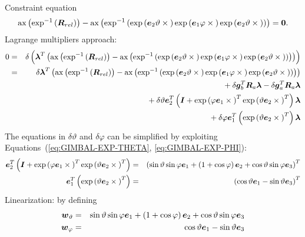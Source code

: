 \documentclass[10pt,dvips,fleqn]{report}
\newcommand{\T}[1]{\boldsymbol{#1}}
\begin{document}
\noindent
Constraint equation
\begin{equation}
	\llk{ax}\plbr{\llk{exp}^{-1}\plbr{\T{R}_{rel}}}
	- \llk{ax}\plbr{\llk{exp}^{-1}\plbr{
		\llk{exp}\plbr{\T{e}_2 \vartheta \times{}}
		\llk{exp}\plbr{\T{e}_1 \varphi \times{}}
		\llk{exp}\plbr{\T{e}_2 \vartheta \times{}}
	}} = \T{0}.
	\label{eq:GIMBAL-CONSTRAINT}
\end{equation}
Lagrange multipliers approach:
\begin{eqnarray*}
	0 & = & \delta\plbr{\T{\lambda}^T\plbr{
	\llk{ax}\plbr{\llk{exp}^{-1}\plbr{\T{R}_{rel}}}
	- \llk{ax}\plbr{\llk{exp}^{-1}\plbr{
		\llk{exp}\plbr{\T{e}_2 \vartheta \times{}}
		\llk{exp}\plbr{\T{e}_1 \varphi \times{}}
		\llk{exp}\plbr{\T{e}_2 \vartheta \times{}}
	}}
	}} \\
	& = & \delta\T{\lambda}^T \plbr{
	\llk{ax}\plbr{\llk{exp}^{-1}\plbr{\T{R}_{rel}}}
	- \llk{ax}\plbr{\llk{exp}^{-1}\plbr{
		\llk{exp}\plbr{\T{e}_2 \vartheta \times{}}
		\llk{exp}\plbr{\T{e}_1 \varphi \times{}}
		\llk{exp}\plbr{\T{e}_2 \vartheta \times{}}
	}}
	} \\
	& & \mbox{} + \delta\T{g}_b^T \T{R}_a \T{\lambda}
	- \delta\T{g}_a^T \T{R}_a \T{\lambda} \\
	& & \mbox{} + \delta\vartheta \T{e}_2^T \plbr{
		\T{I} + \llk{exp}\plbr{\varphi \T{e}_1 \times{}}^T
			\llk{exp}\plbr{\vartheta \T{e}_2 \times{}}^T
	} \T{\lambda} \\
	& & \mbox{} + \delta\varphi \T{e}_1^T \plbr{
		\llk{exp}\plbr{\vartheta \T{e}_2 \times{}}^T
	} \T{\lambda}
\end{eqnarray*}
The equations in $\delta\vartheta $ and $\delta\varphi$ can be simplified
by exploiting Equations~(\ref{eq:GIMBAL-EXP-THETA}, \ref{eq:GIMBAL-EXP-PHI}):
\begin{eqnarray*}
	\T{e}_2^T \plbr{
		\T{I} + \llk{exp}\plbr{\varphi \T{e}_1 \times{}}^T
			\llk{exp}\plbr{\vartheta \T{e}_2 \times{}}^T
	} & = & \plbr{
		\sin\vartheta \sin\varphi \T{e}_1
		+ \plbr{1 + \cos\varphi} \T{e}_2 
		+ \cos\vartheta\sin\varphi \T{e}_3
	}^T \\
	\T{e}_1^T \plbr{
		\llk{exp}\plbr{\vartheta \T{e}_2 \times{}}^T
	} & = & \plbr{
		\cos\vartheta \T{e}_1 - \sin\vartheta \T{e}_3
	}^T 
\end{eqnarray*}
Linearization: by defining
\begin{eqnarray*}
	\T{w}_{\vartheta} & = & 
		\sin\vartheta \sin\varphi \T{e}_1
		+ \plbr{1 + \cos\varphi} \T{e}_2 
		+ \cos\vartheta\sin\varphi \T{e}_3 \\
	\T{w}_{\varphi} & = & 
		\cos\vartheta \T{e}_1 - \sin\vartheta \T{e}_3
\end{eqnarray*}
\end{document}
